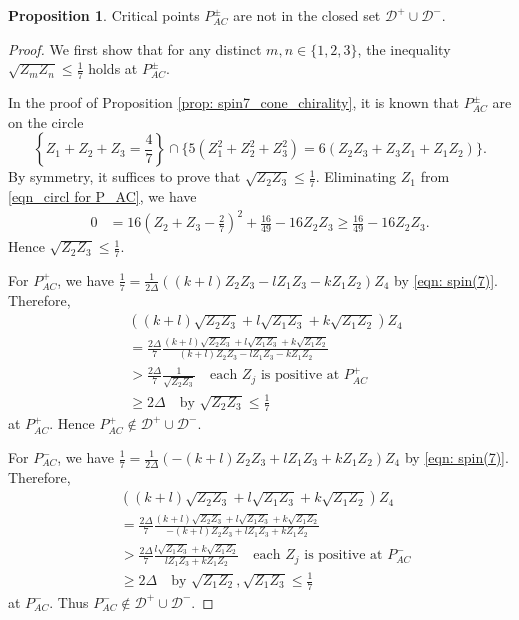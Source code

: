 \documentclass[11pt,letterpaper]{amsart}
\theoremstyle{definition}
\newtheorem{proposition}[theorem]{Proposition}
\numberwithin{equation}{section}
\begin{document}
\begin{proposition}
\label{prop_AC not in D}
Critical points $P_{AC}^\pm$ are not in the closed set $\mathcal{D}^+\cup \mathcal{D}^-$.
\end{proposition}
\begin{proof}
We first show that for any distinct $m,n\in \{1,2,3\}$, the inequality $\sqrt{Z_mZ_n}\leq \frac{1}{7}$ holds at $P_{AC}^\pm$. 

In the proof of Proposition \ref{prop: spin7_cone_chirality}, it is known that $P_{AC}^\pm$ are on the circle 
\begin{equation}
\label{eqn_circl for P_AC}
\left\{Z_1+Z_2+Z_3=\frac{4}{7}\right\}\cap \{5(Z_1^2+Z_2^2+Z_3^2)=6(Z_2Z_3+Z_3Z_1+Z_1Z_2)\}.
\end{equation}
By symmetry, it suffices to prove that $\sqrt{Z_2Z_3}\leq \frac{1}{7}$. Eliminating $Z_1$ from \eqref{eqn_circl for P_AC}, we have 
\begin{equation}
\begin{split}
0&= 16\left(Z_2+Z_3-\frac{2}{7}\right)^2+\frac{16}{49}-16Z_2Z_3\geq \frac{16}{49}-16Z_2Z_3.
\end{split}
\end{equation}
Hence $\sqrt{Z_2Z_3}\leq \frac{1}{7}$.

For $P_{AC}^+$, we have
$
\frac{1}{7}=\frac{1}{2\Delta}((k+l)Z_2Z_3-lZ_1Z_3-kZ_1Z_2)Z_4
$
by \eqref{eqn: spin(7)}. Therefore,
\begin{equation}
\begin{split}
&((k+l)\sqrt{Z_2Z_3}+l\sqrt{Z_1Z_3}+k\sqrt{Z_1Z_2})Z_4\\
&=\frac{2\Delta}{7}\frac{(k+l)\sqrt{Z_2Z_3}+l\sqrt{Z_1Z_3}+k\sqrt{Z_1Z_2}}{(k+l)Z_2Z_3-lZ_1Z_3-kZ_1Z_2} \\
&> \frac{2\Delta}{7}\frac{1}{\sqrt{Z_2Z_3}} \quad \text{each $Z_j$ is positive at $P_{AC}^+$}\\
&\geq 2\Delta \quad \text{by $\sqrt{Z_2Z_3}\leq \frac{1}{7}$}
\end{split}
\end{equation}
at $P_{AC}^+$. Hence $P_{AC}^+ \notin \mathcal{D}^+ \cup \mathcal{D}^-$.

For $P_{AC}^-$, we have 
$
\frac{1}{7}=\frac{1}{2\Delta}(-(k+l)Z_2Z_3+lZ_1Z_3+kZ_1Z_2)Z_4
$
by \eqref{eqn: spin(7)}. Therefore,
\begin{equation}
\begin{split}
&((k+l)\sqrt{Z_2Z_3}+l\sqrt{Z_1Z_3}+k\sqrt{Z_1Z_2})Z_4\\
&=\frac{2\Delta}{7}\frac{(k+l)\sqrt{Z_2Z_3}+l\sqrt{Z_1Z_3}+k\sqrt{Z_1Z_2}}{-(k+l)Z_2Z_3+lZ_1Z_3+kZ_1Z_2} \\
&> \frac{2\Delta}{7}\frac{l\sqrt{Z_1Z_3}+k\sqrt{Z_1Z_2}}{lZ_1Z_3+kZ_1Z_2} \quad \text{each $Z_j$ is positive at $P_{AC}^-$}\\
&\geq 2\Delta \quad \text{by $\sqrt{Z_1Z_2}, \sqrt{Z_1Z_3}\leq \frac{1}{7}$}
\end{split}
\end{equation}
at $P_{AC}^-$. Thus $P_{AC}^- \notin \mathcal{D}^+ \cup \mathcal{D}^-$.
\end{proof}
\end{document}
